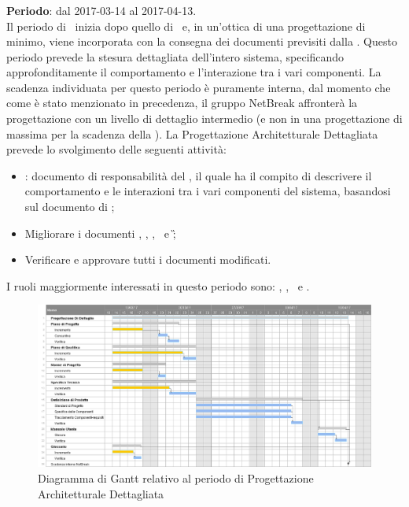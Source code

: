 	
		\subsubsection{\PD}
		\textbf{Periodo}: dal 2017-03-14 al 2017-04-13.\\
		Il periodo di \PD\ inizia dopo quello di \PA\ e, in un'ottica di una progettazione di minimo, viene incorporata con la consegna dei documenti previsiti dalla \RQ. Questo periodo prevede la stesura dettagliata dell’intero sistema, specificando approfonditamente il comportamento e l’interazione tra i vari componenti. La scadenza individuata per questo periodo è puramente interna, dal momento che come è stato menzionato in precedenza, il gruppo NetBreak affronterà la progettazione con un livello di dettaglio intermedio (e non in una progettazione di massima per la scadenza della \RP).
		La Progettazione Architetturale Dettagliata prevede lo svolgimento delle seguenti attività:
		\begin{itemize}
			\item \textit{\DDP}: documento di responsabilità del \textit{\Prog}, il quale ha il compito di descrivere il comportamento	e le interazioni tra i vari componenti del sistema, basandosi sul documento di \ST;
			\item  Migliorare i documenti \NdP, \PdP, \PdQ, \ST\ e \G;
			\item Verificare e approvare tutti i documenti modificati.
		\end{itemize}
		I ruoli maggiormente interessati in questo periodo sono: \textit{\Amm}, \textit{\Res}, \textit{\Prog}\ e \textit{\Ver}.
		
		\begin{figure}[H]
			\centering
			\includegraphics[scale=0.35]{img/ganttnetbreak4.png}
			\caption{Diagramma di Gantt relativo al periodo di Progettazione Architetturale Dettagliata}
		\end{figure}
		
